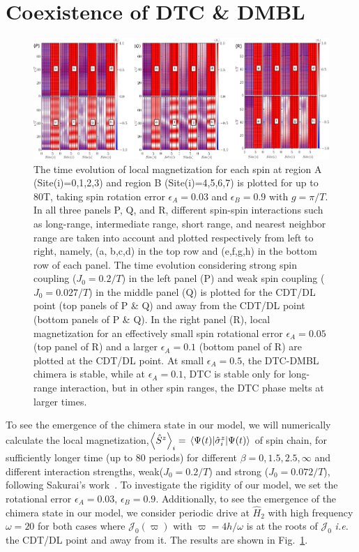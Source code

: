 \documentclass[%
reprint,
superscriptaddress,
amsmath,amssymb,showkeys,
aps,
prb,
]{revtex4-2}
\begin{document}
	
	\section{\label{sec:level3}Coexistence of DTC \& DMBL}
	
	
	\begin{figure}[t!]
		\centering
		\includegraphics[width=17.5cm]{sz_t_strongweakJ_ea_N_8.pdf}
		\caption{The time evolution of local magnetization for each spin at region A (Site(i)=0,1,2,3) and region B (Site(i)=4,5,6,7) is plotted for up to 80T, taking spin rotation error $\epsilon_A = 0.03$ and $\epsilon_B = 0.9$ with $g=\pi/T$.  In all three panels P, Q, and R, different spin-spin interactions such as long-range, intermediate range, short range, and nearest neighbor range are taken into account and plotted respectively from left to right, namely, (a, b,c,d) in the top row and (e,f,g,h) in the bottom row of each panel. The time evolution considering strong spin coupling ($J_0 = 0.2/T$) in the left panel (P) and weak spin coupling ($J_0 = 0.027/T$) in the middle panel (Q) is plotted  for the CDT/DL point (top panels of P \& Q) and away from the CDT/DL point (bottom panels of P \& Q). In the right panel (R), local magnetization for an effectively small spin rotational error $\epsilon_A = 0.05$ (top panel of R) and a larger $\epsilon_A = 0.1$ (bottom panel of R) are plotted at the CDT/DL point. At small $\epsilon_A=0.5$, the DTC-DMBL chimera is stable, while at $\epsilon_A=0.1$, DTC is stable only for long-range interaction, but in other spin ranges, the DTC phase melts at larger times.}
		\label{Fig:strong_weak_ea}
	\end{figure}
	
	To see the emergence of the chimera state in our model, we will numerically calculate the local magnetization,$\left\langle{\hat{S}^z}\right\rangle_i = \expval{\hat{\sigma}^z_i}{\Psi(t)}$ of spin chain, for sufficiently longer time (up to 80 periods) for different $\beta = 0,1.5,2.5,\infty$ and different interaction strengths, weak($J_0 = 0.2/T$) and strong ($J_0 = 0.072/T$), following Sakurai's work~\cite{sakurai_phys_nodate}. To investigate the rigidity of our model, we set the rotational error $\epsilon_A = 0.03$, $\epsilon_B = 0.9$. Additionally, to see the emergence of the chimera state in our model, we consider periodic drive at $\hat{H}_2$ with high frequency $\omega=20$ for both cases where $\mathcal{J}_0(\varpi)$ with $\varpi = 4h/\omega$ is at the roots of $\mathcal{J}_0$ \textit{i.e.} the CDT/DL point and away from it. The results are shown in Fig.~\ref{Fig:strong_weak_ea}. 
	
\end{document}
